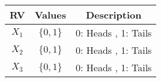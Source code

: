 
\begin{center}
\begin{tabular}{|c|c|c|}
\hline
\textbf{RV}& \textbf{Values} & \textbf{Description} \\ \hline
$X_1$		   & 	$\{0,1\}$	&   0: Heads , 1: Tails\\ \hline
$X_2$ 		   & 	$\{0,1\}$	&	0: Heads , 1: Tails\\ \hline
$X_3$		   & 	$\{0,1\}$	&   0: Heads , 1: Tails\\ \hline
\end{tabular}
\end{center}
